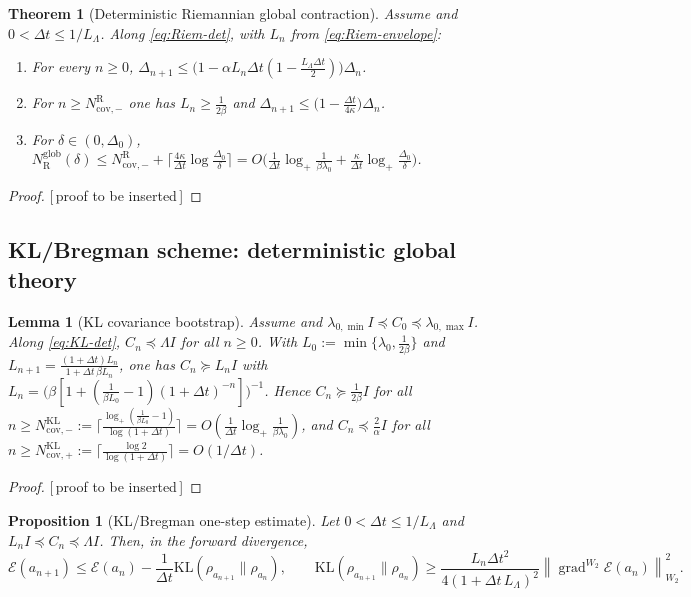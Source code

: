 \documentclass[11pt]{article}
\theoremstyle{plain}
\newtheorem{theorem}{Theorem}[section]
\newtheorem{proposition}[proposition]{Proposition}
\newtheorem{lemma}[lemma]{Lemma}
\theoremstyle{definition}
\theoremstyle{remark}
\newcommand{\KL}{\mathrm{KL}}
\newcommand{\Id}{I}
\newcommand{\grad}{\operatorname{grad}}
\newcommand{\Riem}{\mathrm{R}}
\newcommand{\calE}{\mathcal{E}}
\newcommand{\norm}[1]{\left\lVert #1\right\rVert}
\newcommand{\logp}{\log_+}
\newcommand{\glob}{\mathrm{glob}}
\newcommand{\cov}{\mathrm{cov}}
\newcommand{\LB}{L_\Lambda}
\newcommand{\PROOFHOLE}{{\color{red}\textsf{[\,proof to be inserted\,]}}}
\begin{document}
\begin{theorem}[Deterministic Riemannian global contraction]
\label{thm:Riem-global}
Assume  and $0<\Delta t\leq1/\LB$. Along \eqref{eq:Riem-det}, with
$L_n$ from \eqref{eq:Riem-envelope}:
\begin{enumerate}
\item For every $n\geq0$,
$\Delta_{n+1}\leq\bigl(1-\alpha L_n\Delta t(1-\tfrac{\LB\Delta t}2)\bigr)\Delta_n$.
\item For $n\geq N_{\cov,-}^{\Riem}$ one has $L_n\geq\tfrac1{2\beta}$ and
$\Delta_{n+1}\leq\bigl(1-\tfrac{\Delta t}{4\kappa}\bigr)\Delta_n$.
\item For $\delta\in(0,\Delta_0)$,
$N_{\Riem}^{\glob}(\delta)\leq N_{\cov,-}^{\Riem}+\lceil\tfrac{4\kappa}{\Delta t}\log\tfrac{\Delta_0}\delta\rceil
=O\bigl(\tfrac1{\Delta t}\logp\tfrac1{\beta\lambda_0}+\tfrac\kappa{\Delta t}\logp\tfrac{\Delta_0}\delta\bigr)$.
\end{enumerate}
\end{theorem}

\begin{proof}
\PROOFHOLE
\end{proof}

\subsection{KL/Bregman scheme: deterministic global theory}
\label{sec:KL-global}

\begin{lemma}[KL covariance bootstrap]
\label{lem:KL-cov}
Assume  and $\lambda_{0,\min}\Id\preceq C_0\preceq\lambda_{0,\max}\Id$.
Along \eqref{eq:KL-det}, $C_n\preceq\Lambda\Id$ for all $n\geq0$. With
$L_0:=\min\{\lambda_0,\tfrac1{2\beta}\}$ and $L_{n+1}=\tfrac{(1+\Delta t)L_n}{1+\Delta t\,\beta L_n}$,
one has $C_n\succeq L_n\Id$ with
$L_n=\bigl(\beta[1+(\tfrac1{\beta L_0}-1)(1+\Delta t)^{-n}]\bigr)^{-1}$. Hence $C_n\succeq\tfrac1{2\beta}\Id$
for all
$n\geq N_{\cov,-}^{\KL}:=\lceil\tfrac{\logp(\tfrac1{\beta L_0}-1)}{\log(1+\Delta t)}\rceil
=O(\tfrac1{\Delta t}\logp\tfrac1{\beta\lambda_0})$,
and $C_n\preceq\tfrac2\alpha\Id$ for all $n\geq N_{\cov,+}^{\KL}:=\lceil\tfrac{\log2}{\log(1+\Delta t)}\rceil=O(1/\Delta t)$.
\end{lemma}

\begin{proof}
\PROOFHOLE
\end{proof}

\begin{proposition}[KL/Bregman one-step estimate]
\label{prop:KL-onestep}
Let $0<\Delta t\leq1/\LB$ and $L_n\Id\preceq C_n\preceq\Lambda\Id$. Then, in the forward divergence,
\[
    \calE(a_{n+1})\leq\calE(a_n)-\frac1{\Delta t}\KL(\rho_{a_{n+1}}\|\rho_{a_n}),
    \qquad
    \KL(\rho_{a_{n+1}}\|\rho_{a_n})
    \geq\frac{L_n\Delta t^2}{4(1+\Delta t\,\LB)^2}\norm{\grad^{W_2}\calE(a_n)}_{W_2}^2 .
\]
\end{proposition}
\end{document}
